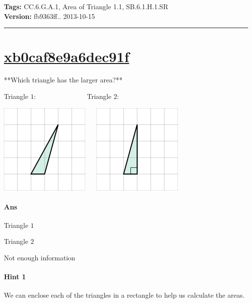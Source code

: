 \documentclass[twocolumn,10pt]{article}
\def\shrinkfactor{0.55}
\begin{document}
\medskip
\noindent
\textbf{Tags:} {\footnotesize CC.6.G.A.1, Area of Triangle 1.1, SB.6.1.H.1.SR}\\
\textbf{Version:} fb9363ff.. 2013-10-15
\smallskip\hrule





\section{\href{https://www.khanacademy.org/devadmin/content/items/xb0caf8e9a6dec91f}{xb0caf8e9a6dec91f}}

\noindent
**Which triangle has the larger area?**  

Triangle $1$:  $\qquad\qquad \qquad ~~~~$ Triangle $2$:  

\includegraphics[scale=\shrinkfactor]{figures/c64b4d770bfcac7be00c3880806f0e6b75094446.png} $\quad$ 
\includegraphics[scale=\shrinkfactor]{figures/a43213f31b2af310e56805358770e9ac01dfc3ce.png}

\paragraph{Ans} 

Triangle $1$

Triangle $2$


 Not enough information



\paragraph{Hint 1}We can enclose each of the triangles in a rectangle to help us calculate the areas.  
\end{document}
